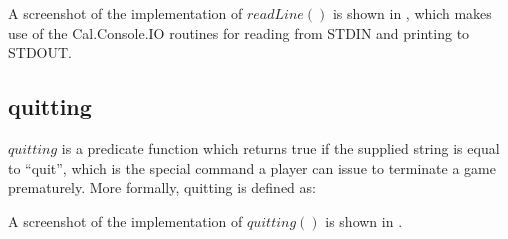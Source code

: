 A screenshot of the implementation of \(readLine()\) is shown in , which makes use of the Cal.Console.IO routines for reading from STDIN and printing to STDOUT.


\subsection{quitting}

\(quitting\) is a predicate function which returns true if the supplied string is equal to ``quit'', which is the special command a player can issue to terminate a game prematurely.  More formally, quitting is defined as:


A screenshot of the implementation of \(quitting()\) is shown in .

